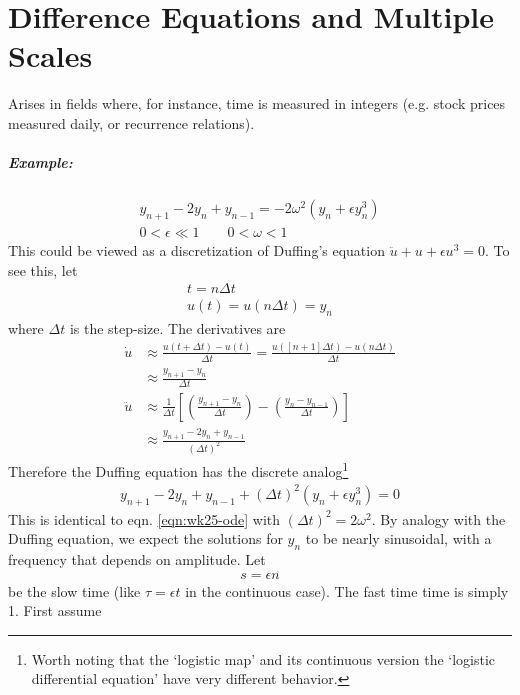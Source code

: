 \chapter{Difference Equations and Multiple Scales}

Arises in fields where, for instance, time is measured in integers (e.g. stock prices measured daily, or recurrence relations). 

\paragraph{Example:}
\begin{gather}
	y_{n+1} - 2y_n + y_{n-1} = -2\omega^2 (y_n + \epsilon y_n^3) \label{eqn:wk25-ode}\\
0 < \epsilon \ll 1 \qquad 0 < \omega <1 \nonumber 
\end{gather}
This could be viewed as a discretization of Duffing's equation $\ddot{u} + u + \epsilon u^3 = 0$. To see this, let
\begin{gather*}
	t = n \Delta t \\
	u(t) = u(n \Delta t) = y_n
\end{gather*}
where $\Delta t$ is the step-size. The derivatives are
\begin{align*}
	\dot u &\approx \frac{u(t+\Delta t) - u(t)}{\Delta t} = \frac{u([n+1]\Delta t) - u(n\Delta t)}{\Delta t} \\
	& \approx \frac{y_{n+1}-y_n}{\Delta t} \\
	\ddot u &\approx \frac{1}{\Delta t} \left[ \left(\frac{y_{n+1} - y_n}{\Delta t}\right) - \left(\frac{y_{n} - y_{n-1}}{\Delta t}\right)\right] \\
	& \approx \frac{y_{n+1} - 2 y_n + y_{n-1}}{(\Delta t)^2}
\end{align*} 
Therefore the Duffing equation has the discrete analog\footnote{Worth noting that the `logistic map' and its continuous version the `logistic differential equation' have very different behavior.}
\begin{gather*}
	y_{n+1} - 2 y_n + y_{n-1} + (\Delta t)^2 (y_n + \epsilon y_n^3) = 0
\end{gather*}
This is identical to eqn. \ref{eqn:wk25-ode} with $(\Delta t)^2 = 2 \omega^2$. By analogy with the Duffing equation, we expect the solutions for $y_n$ to be nearly sinusoidal, with a frequency that depends on amplitude. Let
\begin{gather*}
	s = \epsilon n
\end{gather*}
be the slow time (like $\tau = \epsilon t$ in the continuous case). The fast time time is simply 1. First assume
